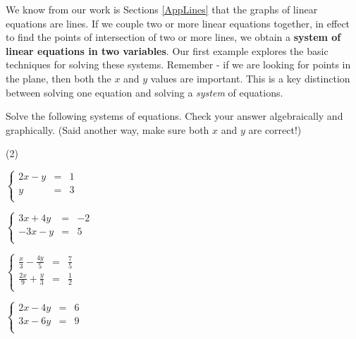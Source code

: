 We know from our work is Sections \ref{AppLines} that the graphs of linear equations are lines.  If we couple two or more linear equations together, in effect to find the points of intersection of two or more lines, we obtain a \textbf{system of linear equations in two variables}.  Our first example explores the basic techniques for solving these systems.  Remember - if we are looking for points in the plane, then both the $x$ and $y$ values are important.  This is a key distinction between solving one equation and solving a \emph{system} of equations.

\begin{ex} \label{reviewsubelim}  Solve the following systems of equations.  Check your answer algebraically and graphically.  (Said another way, make sure both $x$ and $y$ are correct!)

\begin{tasks}(2)

\task  $\left\{ \begin{array}{rcr} 2x - y & = & 1 \\ y & = & 3 \\ \end{array} \right.$ 

\task  $\left\{ \begin{array}{rcr} 3x+4y & = & -2  \\ -3x-y & = & 5 \\ \end{array} \right.$ 

\task  $\left\{ \begin{array}{rcr} \frac{x}{3} -\frac{4y}{5} & = & \frac{7}{5} \\ [3pt] 
\frac{2x}{9} + \frac{y}{3} & = & \frac{1}{2} \\ \end{array} \right.$

\task  $\left\{ \begin{array}{rcr} 2x - 4y & = & 6 \\ 3x -6y & = & 9\\ \end{array} \right.$ 


\end{tasks}
\end{ex}
